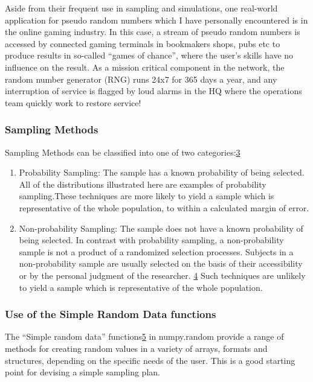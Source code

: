 \documentclass[11pt]{article}
\begin{document}
Aside from their frequent use in sampling and simulations, one
real-world application for pseudo random numbers which I have personally
encountered is in the online gaming industry. In this case, a stream of
pseudo random numbers is accessed by connected gaming terminals in
bookmakers shops, pubs etc to produce results in so-called ``games of
chance'', where the user's skills have no influence on the result. As a
mission critical component in the network, the random number generator
(RNG) runs 24x7 for 365 days a year, and any interruption of service is
flagged by loud alarms in the HQ where the operations team quickly work
to restore service!

    \subsubsection{Sampling Methods}\label{sampling-methods}

Sampling Methods can be classified into one of two
categories:\href{https://onlinecourses.science.psu.edu/stat100/node/18/}{3}

\begin{enumerate}
\def\labelenumi{\arabic{enumi})}
\item
  Probability Sampling: The sample has a known probability of being
  selected. All of the distributions illustrated here are examples of
  probability sampling.These techniques are more likely to yield a
  sample which is representative of the whole population, to within a
  calculated margin of error.
\item
  Non-probability Sampling: The sample does not have a known probability
  of being selected. In contrast with probability sampling, a
  non-probability sample is not a product of a randomized selection
  processes. Subjects in a non-probability sample are usually selected
  on the basis of their accessibility or by the personal judgment of the
  researcher. \href{https://explorable.com/non-probability-sampling}{4}
  Such techniques are unlikely to yield a sample which is representative
  of the whole population.
\end{enumerate}

    \subsubsection{Use of the Simple Random Data
functions}\label{use-of-the-simple-random-data-functions}

The ``Simple random data''
functions\href{https://docs.scipy.org/doc/numpy-1.14.1/reference/routines.random.html\#}{5}
in numpy.random provide a range of methods for creating random values in
a variety of arrays, formats and structures, depending on the specific
needs of the user. This is a good starting point for devising a simple
sampling plan.
\end{document}
